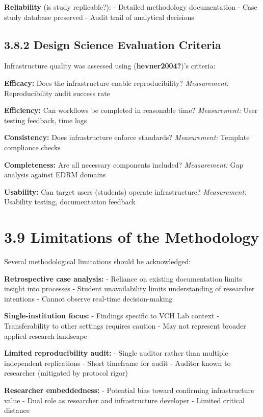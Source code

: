 \documentclass[
  oneside,
  open=any]{scrbook}
\begin{document}
\textbf{Reliability} (is study replicable?): - Detailed methodology
documentation - Case study database preserved - Audit trail of
analytical decisions

\subsection{3.8.2 Design Science Evaluation
Criteria}\label{design-science-evaluation-criteria}

Infrastructure quality was assessed using (\textbf{hevner2004?})'s
criteria:

\textbf{Efficacy:} Does the infrastructure enable reproducibility?
\emph{Measurement:} Reproducibility audit success rate

\textbf{Efficiency:} Can workflows be completed in reasonable time?
\emph{Measurement:} User testing feedback, time logs

\textbf{Consistency:} Does infrastructure enforce standards?
\emph{Measurement:} Template compliance checks

\textbf{Completeness:} Are all necessary components included?
\emph{Measurement:} Gap analysis against EDRM domains

\textbf{Usability:} Can target users (students) operate infrastructure?
\emph{Measurement:} Usability testing, documentation feedback

\section{3.9 Limitations of the
Methodology}\label{limitations-of-the-methodology}

Several methodological limitations should be acknowledged:

\textbf{Retrospective case analysis:} - Reliance on existing
documentation limits insight into processes - Student unavailability
limits understanding of researcher intentions - Cannot observe real-time
decision-making

\textbf{Single-institution focus:} - Findings specific to VCH Lab
context - Transferability to other settings requires caution - May not
represent broader applied research landscape

\textbf{Limited reproducibility audit:} - Single auditor rather than
multiple independent replications - Short timeframe for audit - Auditor
known to researcher (mitigated by protocol rigor)

\textbf{Researcher embeddedness:} - Potential bias toward confirming
infrastructure value - Dual role as researcher and infrastructure
developer - Limited critical distance
\end{document}
